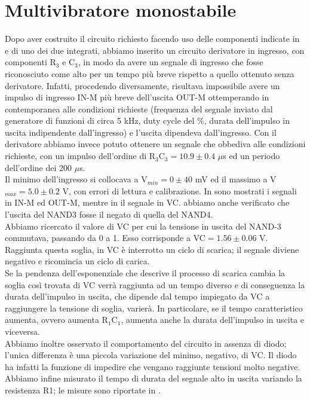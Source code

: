 \section{Multivibratore monostabile}
Dopo aver costruito il circuito richiesto facendo uso delle componenti indicate in  e di uno dei due integrati, abbiamo inserito un circuito derivatore in ingresso, con componenti R$_3$ e C$_3$, in modo da avere un segnale di ingresso che fosse riconosciuto come alto per un tempo più breve rispetto a quello ottenuto senza derivatore. Infatti, procedendo diversamente, risultava impossibile avere un impulso di ingresso IN-M più breve dell'uscita OUT-M ottemperando in contemporanea alle condizioni richieste (frequenza del segnale inviato dal generatore di funzioni di circa 5 kHz, duty cycle del \%, durata dell'impulso in uscita indipendente dall'ingresso) e l'uscita dipendeva dall'ingresso. Con il derivatore abbiamo invece potuto ottenere un segnale che obbediva alle condizioni richieste, con un impulso dell'ordine di R$_3 $C$_3 = 10.9 \pm 0.4$ $\mu$s ed un periodo dell'ordine dei 200 $\mu$s.\\
Il minimo dell'ingresso si collocava a V$_{min} = 0 \pm 40$ mV ed il massimo a V$_{max} = 5.0 \pm 0.2$ V, con errori di lettura e calibrazione. In  sono mostrati i segnali in IN-M ed OUT-M, mentre in  il segnale in VC. abbiamo anche verificato che l'uscita del NAND3 fosse il negato di quella del NAND4.\\ 
Abbiamo ricercato il valore di VC per cui la tensione in uscita del NAND-3 commutava, passando da 0 a 1. Esso corrisponde a VC$ = 1.56 \pm 0.06$ V. Raggiunta questa soglia, in VC è interrotto un ciclo di scarica; il segnale diviene negativo e ricomincia un ciclo di carica.\\
Se la pendenza dell'esponenziale che descrive il processo di scarica cambia la soglia così trovata di VC verrà raggiunta ad un tempo diverso e di conseguenza la durata dell'impulso in uscita, che dipende dal tempo impiegato da VC a raggiungere la tensione di soglia, varierà. In particolare, se il tempo caratteristico aumenta, ovvero aumenta R$_1$C$_1$, aumenta anche la durata dell'impulso in uscita e viceversa.\\
Abbiamo inoltre osservato il comportamento del circuito in assenza di diodo; l'unica differenza è una piccola variazione del minimo, negativo, di VC. Il diodo ha infatti la funzione di impedire che vengano raggiunte tensioni molto negative.\\
Abbiamo infine misurato il tempo di durata del segnale alto in uscita variando la resistenza R1; le misure sono riportate in .
